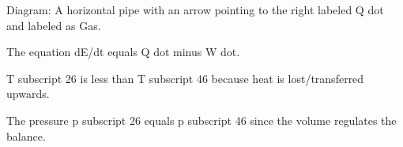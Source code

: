 Diagram:
A horizontal pipe with an arrow pointing to the right labeled Q dot and labeled as Gas.

The equation dE/dt equals Q dot minus W dot.

T subscript 26 is less than T subscript 46 because heat is lost/transferred upwards.

The pressure p subscript 26 equals p subscript 46 since the volume regulates the balance.